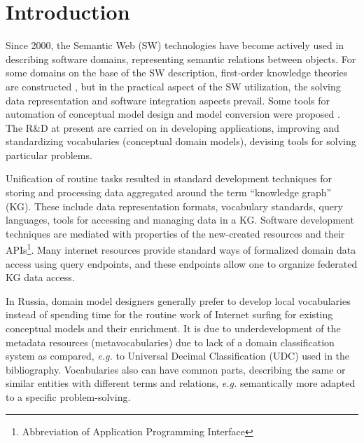 \documentclass[
]{ceurart}
\begin{document}
\maketitle

\section{Introduction}

Since 2000, the Semantic Web (SW) technologies have become actively used in describing software domains, representing semantic relations between objects. For some domains on the base of the SW description, first-order knowledge theories are constructed \cite{}, but in the practical aspect of the SW utilization, the solving data representation and software integration aspects prevail. Some tools for automation of conceptual model design and model conversion were proposed \cite{}. The R\&D at present are carried on in developing applications, improving and standardizing vocabularies (conceptual domain models), devising tools for solving particular problems.

Unification of routine tasks resulted in standard development techniques for storing and processing data aggregated around the term ``knowledge graph'' (KG). These include data representation formats, vocabulary standards, query languages, tools for accessing and managing data in a KG. Software development techniques are mediated with properties of the new-created resources and their APIs\footnote{Abbreviation of Application Programming Interface}. Many internet resources provide standard ways of formalized domain data access using query endpoints, and these endpoints allow one to organize federated KG data access.

In Russia, domain model designers generally prefer to develop local vocabularies instead of spending time for the routine work of Internet surfing for existing conceptual models and their enrichment. It is due to underdevelopment of the metadata resources (metavocabularies) due to lack of a domain classification system as compared, \emph{e.g.} to Universal Decimal Classification (UDC) used in the bibliography. Vocabularies also can have common parts, describing the same or similar entities with different terms and relations, \emph{e.g.} semantically more adapted to a specific problem-solving.
\end{document}
